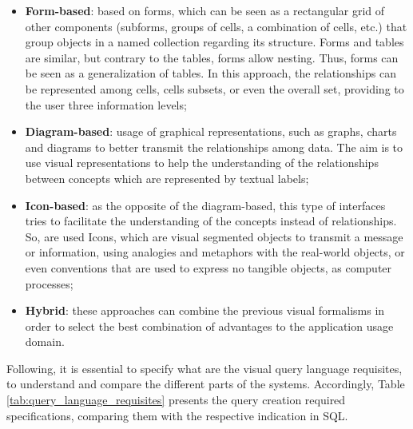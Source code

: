 \begin{itemize}
    \item \textbf{Form-based}: based on forms, which can be seen as a rectangular grid of other components (subforms, groups of cells, a combination of cells, etc.) that group objects in a named collection regarding its structure. Forms and tables are similar,  but contrary to the tables, forms allow nesting. Thus, forms can be seen as a generalization of tables. In this approach, the relationships can be represented among cells, cells subsets, or even the overall set, providing to the user three information levels;
    \item \textbf{Diagram-based}: usage of graphical representations, such as graphs, charts and diagrams to better transmit the relationships among data. The aim is to use visual representations to help the understanding of the relationships between concepts which are represented by textual labels;
    \item \textbf{Icon-based}: as the opposite of the diagram-based, this type of interfaces tries to facilitate the understanding of the concepts instead of relationships. So, are used Icons, which are visual segmented objects to transmit a message or information, using analogies and metaphors with the real-world objects, or even conventions that are used to express no tangible objects, as computer processes;
    \item \textbf{Hybrid}: these approaches can combine the previous visual formalisms in order to select the best combination of advantages to the application usage domain.
\end{itemize}

Following, it is essential to specify what are the visual query language requisites, to understand and compare the different parts of the systems. Accordingly, Table \ref{tab:query_language_requisites} presents the query creation required specifications, comparing them with the respective indication in SQL.

